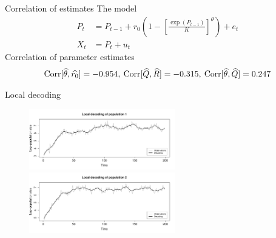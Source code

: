\begin{frame}{Correlation of estimates}
    The model
    \begin{align*}
        P_t &= P_{t-1} + r_0 \left(1 - \left[\frac{\exp{(P_{t-1})}}{K}\right]^\theta\right) + e_t \\
        X_t &= P_t + u_t
    \end{align*}
    Correlation of parameter estimates
    \begin{align*}
        \textrm{Corr}[\widehat{\theta}, \widehat{r_0}] = -0.954,\:
        \textrm{Corr}[\widehat{Q}, \widehat{R}] = -0.315, \:
        \textrm{Corr}[\widehat{\theta}, \widehat{Q}] = 0.247
    \end{align*}
\end{frame}

\begin{frame}{Local decoding}
    \begin{figure}
        \includegraphics[width=240px]{../plots/cont-dataset-1-param-1-decoding.pdf}\\
        \includegraphics[width=240px]{../plots/cont-dataset-2-param-1-decoding.pdf}
    \end{figure}
\end{frame}





